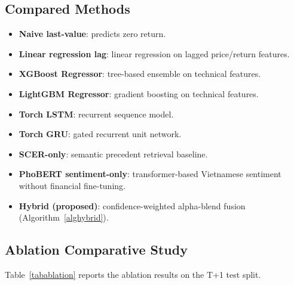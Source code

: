 \documentclass[runningheads]{llncs}
\begin{document}
\subsection{Compared Methods}
\label{secbaselines}

\begin{itemize}
\item \textbf{Naive last-value}: predicts zero return.
\item \textbf{Linear regression lag}: linear regression on lagged price/return features.
\item \textbf{XGBoost Regressor}: tree-based ensemble on technical features.
\item \textbf{LightGBM Regressor}: gradient boosting on technical features.
\item \textbf{Torch LSTM}: recurrent sequence model.
\item \textbf{Torch GRU}: gated recurrent unit network.
\item \textbf{SCER-only}: semantic precedent retrieval baseline.
\item \textbf{PhoBERT sentiment-only}: transformer-based Vietnamese sentiment without financial fine-tuning.
\item \textbf{Hybrid (proposed)}: confidence-weighted alpha-blend fusion (Algorithm~\ref{alghybrid}).
\end{itemize}

\subsection{Ablation Comparative Study}
\label{secablation-study}

Table~\ref{tabablation} reports the ablation results on the T+1 test split.
\end{document}
